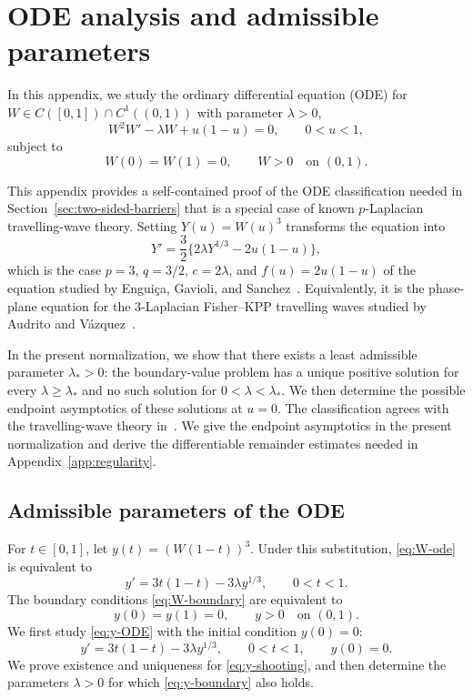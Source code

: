 \documentclass[12pt]{amsart}
\numberwithin{equation}{section}
\theoremstyle{plain}
\theoremstyle{definition}
\begin{document}
\appendix
\section{ODE analysis and admissible parameters}
\label{app:ode}
In this appendix, we study the ordinary differential equation (ODE) for \(W\in C([0,1])\cap C^1((0,1))\) with parameter \(\lambda > 0\),
\begin{equation}
 W^2W'-\lambda W+u(1-u)=0,
 \qquad 0<u<1,
 \label{eq:W-ode}
\end{equation}
subject to
\begin{equation}
 W(0)=W(1)=0,
 \qquad W>0\quad\text{on }(0,1).
 \label{eq:W-boundary}
\end{equation}

This appendix provides a self-contained proof of the ODE classification needed in Section~\ref{sec:two-sided-barriers} that is a special case of known $p$-Laplacian travelling-wave theory. Setting $Y(u)=W(u)^3$ transforms the equation into
\[
Y'=\frac32\{2\lambda Y^{1/3}-2u(1-u)\},
\]
which is the case $p=3$, $q=3/2$, $c=2\lambda$, and $f(u)=2u(1-u)$
of the equation studied by Engui\c{c}a, Gavioli, and
Sanchez~\cite{EnguicaGavioliSanchez2013}. Equivalently, it is the phase-plane equation for the $3$-Laplacian Fisher--KPP travelling waves studied by Audrito and Vázquez~\cite[Theorem~2.1 and Section~3]{AudritoVazquez2017}.

In the present normalization, we show that there exists a least admissible parameter $\lambda_*>0$: the
boundary-value problem has a unique positive solution for every
$\lambda\ge\lambda_*$ and no such solution for $0<\lambda<\lambda_*$.  We
then determine the possible endpoint asymptotics of these solutions at
$u=0$. The classification agrees with the travelling-wave theory
in~\cite{EnguicaGavioliSanchez2013,AudritoVazquez2017}. We give the endpoint
asymptotics in the present normalization and derive the differentiable
remainder estimates needed in Appendix~\ref{app:regularity}.

\subsection{Admissible parameters of the ODE}

For $t\in[0,1]$, let $y(t)=(W(1-t))^3$.  Under this substitution,
\eqref{eq:W-ode} is equivalent to
\begin{equation}
 y'=3t(1-t)-3\lambda y^{1/3}, \qquad 0<t<1.
 \label{eq:y-ODE}
\end{equation}
The boundary conditions \eqref{eq:W-boundary} are equivalent to
\begin{equation}
    \label{eq:y-boundary}
 y(0)=y(1)=0, \qquad y>0 \quad\text{on }(0,1).
\end{equation}
We first study \eqref{eq:y-ODE} with the initial condition $y(0)=0$:
\begin{equation}
 y'=3t(1-t)-3\lambda y^{1/3}, \qquad 0<t<1,\qquad y(0)=0.
 \label{eq:y-shooting}
\end{equation}
We prove existence and uniqueness for \eqref{eq:y-shooting}, and then
determine the parameters $\lambda>0$ for which \eqref{eq:y-boundary} also
holds.
\end{document}
